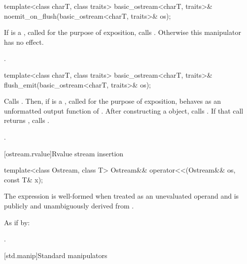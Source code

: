 %
\begin{itemdecl}
template<class charT, class traits>
  basic_ostream<charT, traits>& noemit_on_flush(basic_ostream<charT, traits>& os);
\end{itemdecl}

\begin{itemdescr}
\pnum
\effects
If  is a
,
called  for the purpose of exposition,
calls .
Otherwise this manipulator has no effect.

\pnum
\returns
{}.
\end{itemdescr}

%
\begin{itemdecl}
template<class charT, class traits>
  basic_ostream<charT, traits>& flush_emit(basic_ostream<charT, traits>& os);
\end{itemdecl}

\begin{itemdescr}
\pnum
\effects
Calls .
Then, if  is a
,
called  for the purpose of exposition,
behaves as an unformatted output function
of .
After constructing a  object, calls .
If that call returns , calls .

\pnum
\returns
{}.
\end{itemdescr}

[ostream.rvalue]{Rvalue stream insertion}

%
\begin{itemdecl}
template<class Ostream, class T>
  Ostream&& operator<<(Ostream&& os, const T& x);
\end{itemdecl}

\begin{itemdescr}
\pnum
\constraints
The expression  is well-formed
when treated as an unevaluated operand and
 is publicly and unambiguously derived from .

\pnum
\effects
As if by: 

\pnum
\returns
{}.
\end{itemdescr}


[std.manip]{Standard manipulators}

